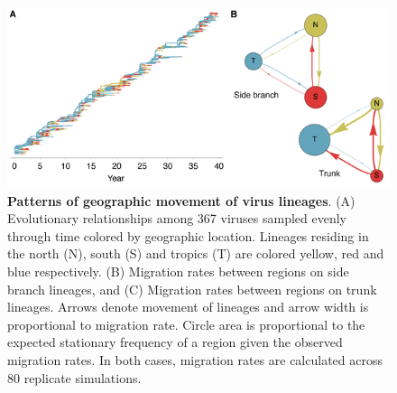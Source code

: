 \pagebreak

\begin{figure}[H]
	\centering
	\includegraphics{figures/spatial}
	\caption{\textbf{Patterns of geographic movement of virus lineages}. (A) Evolutionary relationships among 367 viruses sampled evenly through time colored by geographic location. Lineages residing in the north (N), south (S) and tropics (T) are colored yellow, red and blue respectively. (B) Migration rates between regions on side branch lineages, and (C) Migration rates between regions on trunk lineages. Arrows denote movement of lineages and arrow width is proportional to migration rate. Circle area is proportional to the expected stationary frequency of a region given the observed migration rates.  In both cases, migration rates are calculated across 80 replicate simulations.}
	\label{spatial}
\end{figure}

